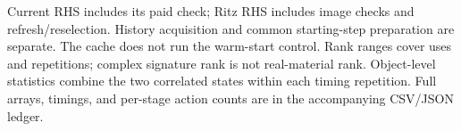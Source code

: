 \noindent Current RHS includes its paid check; Ritz RHS includes image checks and refresh/reselection. History acquisition and common starting-step preparation are separate. The cache does not run the warm-start control. Rank ranges cover uses and repetitions; complex signature rank is not real-material rank. Object-level statistics combine the two correlated states within each timing repetition. Full arrays, timings, and per-stage action counts are in the accompanying CSV/JSON ledger.
